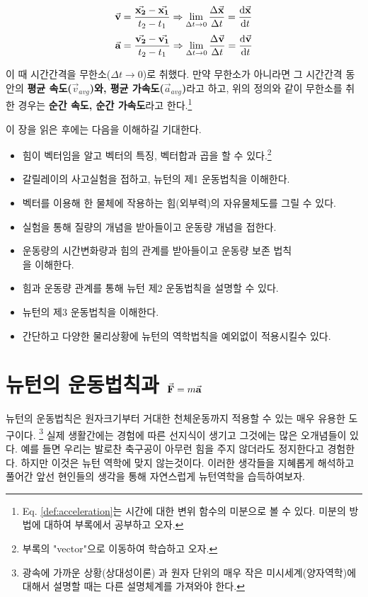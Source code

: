  \begin{defn}
\begin{equation}\label{def:acceleration}
  \va{v} = \frac{\va{x_2}-\va{x_1}}{t_2-t_1} \Rightarrow \lim_{\Delta{t}\to 0}\frac{\Delta{\va{x}}}{\Delta{t}}=\dv{\va{x}}{t}
\end{equation}
\begin{equation}
  \va{a} = \frac{\va{v_2}-\va{v_1}}{t_2-t_1} \Rightarrow \lim_{\Delta{t}\to 0}\frac{\Delta{\va{v}}}{\Delta{t}}=\dv{\va{v}}{t}
\end{equation}

이 때 시간간격을 무한소($\Delta t \rightarrow 0$)로 취했다. 
만약 무한소가 아니라면 그 시간간격 동안의 \textbf{평균 속도($\vec{v}_{avg}$)와, 평균 가속도($\vec{a}_{avg}$)}라고 하고, 
위의 정의와 같이 무한소를 취한 경우는 \textbf{순간 속도, 순간 가속도}라고 한다.\footnote{Eq. \ref{def:acceleration}는 시간에 대한 변위 함수의 미분으로
볼 수 있다. 미분의 방법에 대하여 부록에서 공부하고 오자.}
  \end{defn}






이 장을 읽은 후에는 다음을 이해하길 기대한다.



\tightlists
\begin{itemize}
\item 힘이 벡터임을 알고 벡터의 특징, 벡터합과 곱을 할 수 있다.\footnote{부록의 "vector"으로 이동하여 학습하고 오자.}
\item 갈릴레이의 사고실험을 접하고, 뉴턴의 제1 운동법칙을 이해한다.
\item 벡터를 이용해 한 물체에 작용하는 힘(외부력)의 자유물체도를 그릴 수 있다. 
\item 실험을 통해 질량의 개념을 받아들이고 운동량 개념을 접한다.
\item 운동량의 시간변화량과 힘의 관계를 받아들이고 운동량 보존 법칙\\을 이해한다.
\item 힘과 운동량 관계를 통해 뉴턴 제2 운동법칙을 설명할 수 있다.
\item 뉴턴의 제3 운동법칙을 이해한다.
\item 간단하고 다양한 물리상황에 뉴턴의 역학법칙을 예외없이 적용시킬수 있다.
\end{itemize}

\section{뉴턴의 운동법칙과 $\va{F}=m\va{a}$}
뉴턴의 운동법칙은 원자크기부터 거대한 천체운동까지 적용할 수 있는 매우 유용한 도구이다. \footnote{광속에 가까운 상황(상대성이론)
과 원자 단위의 매우 작은 미시세계(양자역학)에 대해서 설명할 때는 다른 설명체계를 가져와야 한다.} 실제 생활간에는 경험에 따른
선지식이 생기고 그것에는 많은 오개념들이 있다. 예를 들면 우리는 발로찬 축구공이 아무런 힘을 주지 않더라도 정지한다고 경험한다. 
하지만 이것은 뉴턴 역학에 맞지 않는것이다.
이러한 생각들을 지혜롭게 해석하고 풀어간 앞선 현인들의 생각을 통해 자연스럽게 뉴턴역학을 습득하여보자.  

